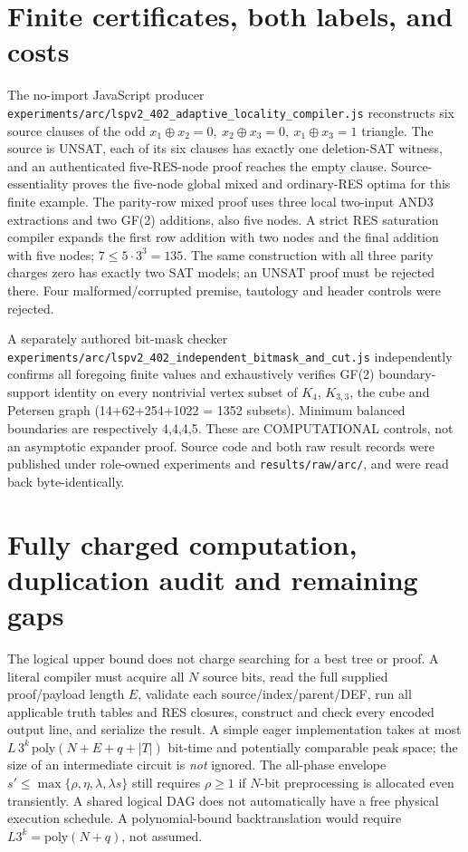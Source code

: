 \documentclass[11pt]{article}
\begin{document}
\section*{Finite certificates, both labels, and costs}
The no-import JavaScript producer \texttt{experiments/arc/lspv2\_402\_adaptive\_locality\_compiler.js} reconstructs six source clauses of the odd \(x_1\oplus x_2=0,\ x_2\oplus x_3=0,\ x_1\oplus x_3=1\) triangle. The source is UNSAT, each of its six clauses has exactly one deletion-SAT witness, and an authenticated five-RES-node proof reaches the empty clause. Source-essentiality proves the five-node global mixed and ordinary-RES optima for this finite example. The parity-row mixed proof uses three local two-input AND3 extractions and two GF(2) additions, also five nodes. A strict RES saturation compiler expands the first row addition with two nodes and the final addition with five nodes; \(7\le 5\cdot3^3=135\). The same construction with all three parity charges zero has exactly two SAT models; an UNSAT proof must be rejected there. Four malformed/corrupted premise, tautology and header controls were rejected.

A separately authored bit-mask checker \texttt{experiments/arc/lspv2\_402\_independent\_bitmask\_and\_cut.js} independently confirms all foregoing finite values and exhaustively verifies GF(2) boundary-support identity on every nontrivial vertex subset of \(K_4\), \(K_{3,3}\), the cube and Petersen graph (14+62+254+1022 = 1352 subsets). Minimum balanced boundaries are respectively 4,4,4,5. These are COMPUTATIONAL controls, not an asymptotic expander proof. Source code and both raw result records were published under role-owned experiments and \texttt{results/raw/arc/}, and were read back byte-identically.

\section*{Fully charged computation, duplication audit and remaining gaps}
The logical upper bound does not charge searching for a best tree or proof. A literal compiler must acquire all \(N\) source bits, read the full supplied proof/payload length \(E\), validate each source/index/parent/DEF, run all applicable truth tables and RES closures, construct and check every encoded output line, and serialize the result. A simple eager implementation takes at most \(L\,3^k\,\mathrm{poly}(N+E+q+|T|)\) bit-time and potentially comparable peak space; the size of an intermediate circuit is \emph{not} ignored. The all-phase envelope \(s'\le\max\{\rho,\eta,\lambda,\lambda s\}\) still requires \(\rho\ge1\) if \(N\)-bit preprocessing is allocated even transiently. A shared logical DAG does not automatically have a free physical execution schedule. A polynomial-bound backtranslation would require \(L3^k=\mathrm{poly}(N+q)\), not assumed.
\end{document}
